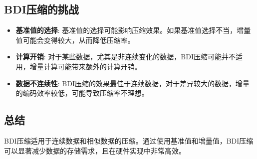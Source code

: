 \documentclass[12pt]{article}
\begin{document}
\subsection{BDI压缩的挑战}

\begin{itemize}
    \item \textbf{基准值的选择}: 基准值的选择可能影响压缩效果。如果基准值选择不当，增量值可能会变得较大，从而降低压缩率。
    \item \textbf{计算开销}: 对于某些数据，尤其是非连续变化的数据，BDI压缩可能并不适用，增量计算可能带来额外的计算开销。
    \item \textbf{数据不连续性}: BDI压缩的效果最佳于连续数据，对于差异较大的数据，增量的编码效率较低，可能导致压缩率不理想。
\end{itemize}

\subsection{总结}

BDI压缩适用于连续数据和相似数据的压缩。通过使用基准值和增量值，BDI压缩可以显著减少数据的存储需求，且在硬件实现中非常高效。
\end{document}
